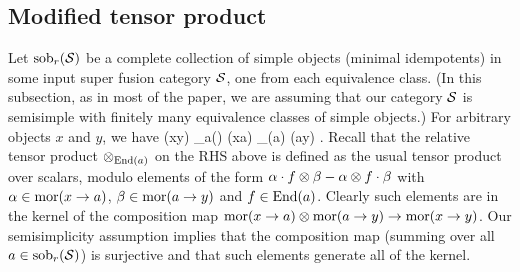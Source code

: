 \subsection{Modified tensor product} \label{modified_tensor_product}



Let $\text{sob}_r(\mathcal{S})$ be a complete collection of simple objects (minimal idempotents) in some 
input super fusion category $\mathcal{S}$, one from each equivalence class.
(In this subsection, as in most of the paper, we are assuming that our category $\mathcal{S}$ is semisimple with finitely many equivalence
classes of simple objects.)
For arbitrary objects $x$ and $y$, we have
\be \label{sobdecomp}
	\mor(x\to y) \: \cong \: \bigoplus_{a\in\sob(\spc)} \mor(x\to a) \tp_{\End(a)} \mor(a\to y) .
\ee
Recall that the relative tensor product $\otimes_{\text{End}(a)}$ on the RHS above is defined as the usual tensor product over scalars, modulo elements
of the form $\alpha \cdot f \otimes \beta - \alpha\otimes f \cdot \beta$ with $\alpha \in \text{mor}(x \to a)$, $\beta \in \text{mor}(a \to y)$ and $f\in \text{End}(a)$.
Clearly such elements are in the kernel of the composition map $\text{mor}(x\to a) \otimes \text{mor}(a\to y) \to \text{mor}(x\to y)$.
Our semisimplicity assumption implies that the composition map (summing over all $a\in \text{sob}_r(\mathcal{S})$) is surjective and that such
elements generate all of the kernel.


